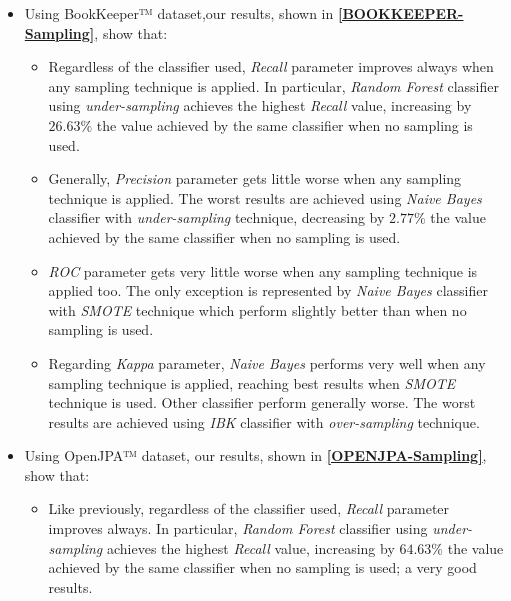 \documentclass[sigconf]{acmart}
\begin{document}
\begin{itemize}

\item Using BookKeeper™ dataset,our results, shown in \textbf{\cref{BOOKKEEPER-Sampling}}, show that:
\begin{itemize}

\item Regardless of the classifier used, \textit{Recall} parameter improves always when any sampling technique is applied. In particular, \textit{Random Forest} classifier using \textit{under-sampling} achieves the highest \textit{Recall} value, increasing by $26.63\%$ the value achieved by the same classifier when no sampling is used.

\item Generally, \textit{Precision} parameter gets little worse when any sampling technique is applied. The worst results are achieved using \textit{Naive Bayes} classifier with \textit{under-sampling} technique, decreasing by $2.77\%$ the value achieved by the same classifier when no sampling is used.

\item \textit{ROC} parameter gets very little worse when any sampling technique is applied too. The only exception is represented by \textit{Naive Bayes} classifier with \textit{SMOTE} technique which perform slightly better than when no sampling is used.

\item Regarding \textit{Kappa} parameter, \textit{Naive Bayes} performs very well when any sampling technique is applied, reaching best results when \textit{SMOTE} technique is used. Other classifier perform generally worse. The worst results are achieved using \textit{IBK} classifier with \textit{over-sampling} technique.

\end{itemize}


\item Using OpenJPA™ dataset, our results, shown in \textbf{\cref{OPENJPA-Sampling}}, show that:
\begin{itemize}

\item Like previously, regardless of the classifier used, \textit{Recall} parameter improves always. In particular, \textit{Random Forest} classifier using \textit{under-sampling} achieves the highest \textit{Recall} value, increasing by $64.63\%$ the value achieved by the same classifier when no sampling is used; a very good results.


\end{itemize}
\end{itemize}
\end{document}
